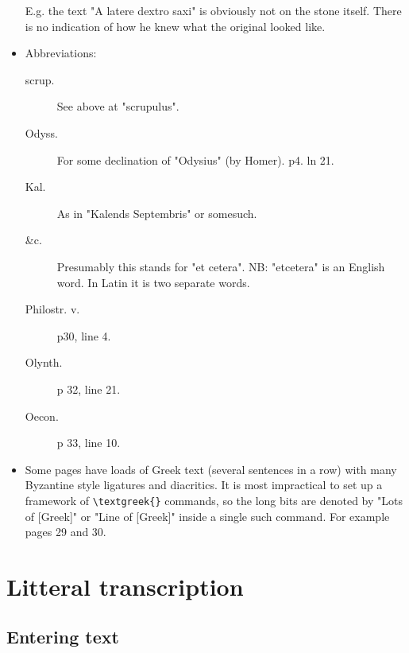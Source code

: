 \documentclass{report}
\begin{document}
\begin{itemize}
E.g. the text "A latere dextro saxi" is obviously not on the stone itself.
There is no indication
of how he knew what the original looked like.
\item
Abbreviations:
\begin{description}
\item[scrup.]See above at "scrupulus".
\item[Odyss.]For some declination of "Odysius" (by Homer). p4. ln 21.
\item[Kal.]As in "Kalends Septembris" or somesuch.
\item[\&c.]Presumably this stands for "et cetera". NB: "etcetera" is an English
word. In Latin it is two separate words.
\item[Philostr. v.]p30, line 4.
\item[Olynth.]p 32, line 21.
\item[Oecon.]p 33, line 10.
\end{description}
\item
Some pages have loads of Greek text (several sentences in a row) with many
Byzantine style ligatures and diacritics. It is most impractical to set up
a framework of \verb+\textgreek{}+ commands, so the long bits are denoted
by "Lots of [Greek]" or "Line of [Greek]" inside a single such command.
For example pages 29 and 30.

\end{itemize}

\chapter{Litteral transcription}
\section{Entering text}
\end{document}
